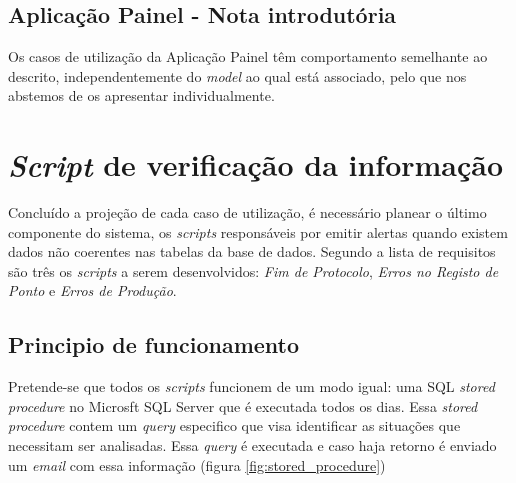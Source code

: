 
\newpage

\newpage

\newpage

\newpage

\newpage

\newpage

\newpage

\newpage

\subsection{Aplicação Painel - Nota introdutória}
Os casos de utilização da Aplicação Painel têm comportamento semelhante ao descrito, independentemente do \textit{model} ao qual está associado, pelo que nos abstemos de os apresentar individualmente.


\newpage

\newpage

\newpage

\newpage

\newpage

\newpage

\newpage

\section{\textit{Script} de verificação da informação}
Concluído a projeção de cada caso de utilização, é necessário planear o último componente do sistema, os \textit{scripts} responsáveis por emitir alertas quando existem dados não coerentes nas tabelas da base de dados. Segundo a lista de requisitos são três os \textit{scripts} a serem desenvolvidos: \textit{Fim de Protocolo}, \textit{Erros no Registo de Ponto} e \textit{Erros de Produção}.

\subsection{Principio de funcionamento}
Pretende-se que todos os \textit{scripts} funcionem de um modo igual: uma SQL \textit{stored procedure} no Microsft SQL Server que é executada todos os dias. Essa \textit{stored procedure} contem um \textit{query} especifico que visa identificar as situações que necessitam ser analisadas. Essa \textit{query} é executada e caso haja retorno é enviado um \textit{email} com essa informação (figura \ref{fig:stored_procedure})

